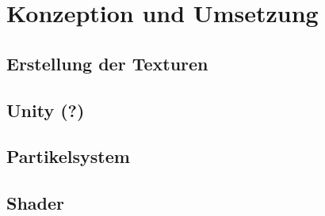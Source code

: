 \section{Konzeption und Umsetzung}
\label{sec:4}
\subsection{Erstellung der Texturen}
\subsection{Unity (?)}
\subsection{Partikelsystem}
\subsection{Shader}


\newpage
